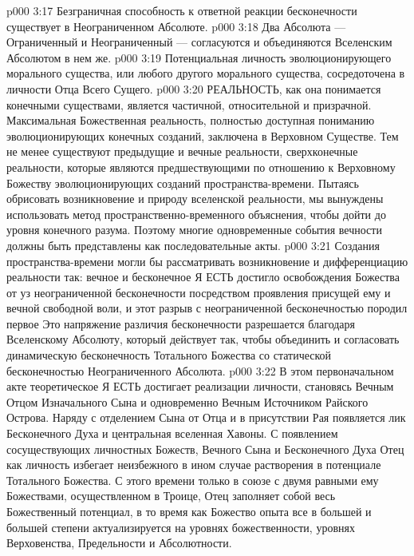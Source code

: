 \vs p000 3:17 \bibnobreakspace Безграничная способность к ответной реакции бесконечности существует в Неограниченном Абсолюте.
\vs p000 3:18 \bibnobreakspace Два Абсолюта --- Ограниченный и Неограниченный --- согласуются и объединяются Вселенским Абсолютом в нем же.
\vs p000 3:19 \bibnobreakspace Потенциальная личность эволюционирующего морального существа, или любого другого морального существа, сосредоточена в личности Отца Всего Сущего.
\vs p000 3:20 \pc РЕАЛЬНОСТЬ, как она понимается конечными существами, является частичной, относительной и призрачной. Максимальная Божественная реальность, полностью доступная пониманию эволюционирующих конечных созданий, заключена в Верховном Существе. Тем не менее существуют предыдущие и вечные реальности, сверхконечные реальности, которые являются предшествующими по отношению к Верховному Божеству эволюционирующих созданий пространства\hyp{}времени. Пытаясь обрисовать возникновение и природу вселенской реальности, мы вынуждены использовать метод пространственно\hyp{}временного объяснения, чтобы дойти до уровня конечного разума. Поэтому многие одновременные события вечности должны быть представлены как последовательные акты.
\vs p000 3:21 Создания пространства\hyp{}времени могли бы рассматривать возникновение и дифференциацию реальности так: вечное и бесконечное Я ЕСТЬ достигло освобождения Божества от уз неограниченной бесконечности посредством проявления присущей ему и вечной свободной воли, и этот разрыв с неограниченной бесконечностью породил первое  Это напряжение различия бесконечности разрешается благодаря Вселенскому Абсолюту, который действует так, чтобы объединить и согласовать динамическую бесконечность Тотального Божества со статической бесконечностью Неограниченного Абсолюта.
\vs p000 3:22 В этом первоначальном акте теоретическое Я ЕСТЬ достигает реализации личности, становясь Вечным Отцом Изначального Сына и одновременно Вечным Источником Райского Острова. Наряду с отделением Сына от Отца и в присутствии Рая появляется лик Бесконечного Духа и центральная вселенная Хавоны. С появлением сосуществующих личностных Божеств, Вечного Сына и Бесконечного Духа Отец как личность избегает неизбежного в ином случае растворения в потенциале Тотального Божества. С этого времени только в союзе с двумя равными ему Божествами, осуществленном в Троице, Отец заполняет собой весь Божественный потенциал, в то время как Божество опыта все в большей и большей степени актуализируется на уровнях божественности, уровнях Верховенства, Предельности и Абсолютности.
